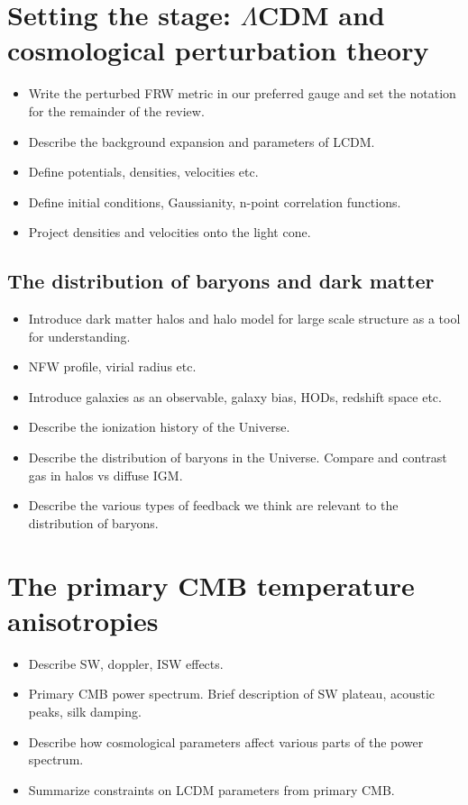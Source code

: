 \documentclass[aps,nofootinbib,groupedaddress]{revtex4}
\begin{document}
\section{Setting the stage: $\Lambda$CDM and cosmological perturbation theory}

\begin{itemize}
\item Write the perturbed FRW metric in our preferred gauge and set the notation for the remainder of the review. 
\item Describe the background expansion and parameters of LCDM.
\item Define potentials, densities, velocities etc.
\item Define initial conditions, Gaussianity, n-point correlation functions.
\item Project densities and velocities onto the light cone.
\end{itemize}

\subsection{The distribution of baryons and dark matter}

\begin{itemize}
\item Introduce dark matter halos and halo model for large scale structure as a tool for understanding. 
\item NFW profile, virial radius etc.
\item Introduce galaxies as an observable, galaxy bias, HODs, redshift space etc.
\item Describe the ionization history of the Universe. 
\item Describe the distribution of baryons in the Universe. Compare and contrast gas in halos vs diffuse IGM.
\item Describe the various types of feedback we think are relevant to the distribution of baryons.
\end{itemize}


\section{The primary CMB temperature anisotropies}

\begin{itemize}
\item Describe SW, doppler, ISW effects.
\item Primary CMB power spectrum. Brief description of SW plateau, acoustic peaks, silk damping.
\item Describe how cosmological parameters affect various parts of the power spectrum.
\item Summarize constraints on LCDM parameters from primary CMB.
\end{itemize}
\end{document}
